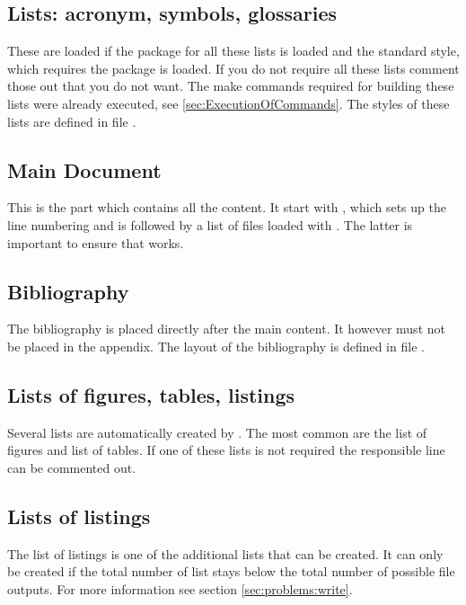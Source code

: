 \subsection{Lists: acronym, symbols, glossaries}
These are loaded if the package for all these lists is loaded and the standard style, which requires the  package is loaded. If you do not require all these lists comment those out that you do not want. The make commands required for building these lists were already executed, see \vref{sec:ExecutionOfCommands}. The styles of these lists are defined in file .

\subsection{Main Document}
This is the part which contains all the content. It start with , which sets up the line numbering and is followed by a list of files loaded with . The latter is important to ensure that  works.

\subsection{Bibliography}
The bibliography is placed directly after the main content. It however must not be placed in the appendix. The layout of the bibliography is defined in file .
%

\subsection{Lists of figures, tables, listings}
Several lists are automatically created by \latex. The most common are the list of figures and list of tables. If one of these lists is not required the responsible line can be commented out. 
%

\subsection{Lists of listings}
The list of listings is one of the additional lists that can be created. 
It can only be created if the total number of list stays below the total number of possible file outputs. For more information see section \ref{sec:problems:write}.

